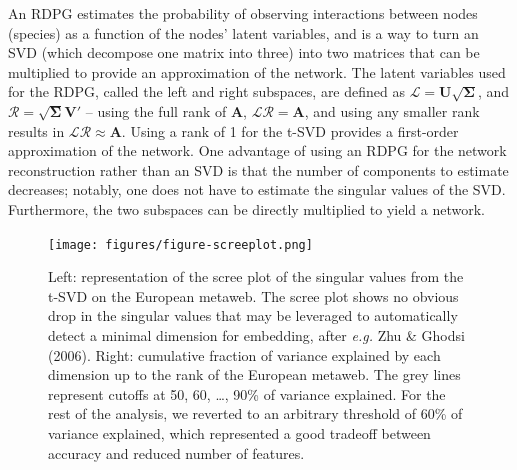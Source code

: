 \documentclass[10pt,oneside]{article}
\begin{document}
An RDPG estimates the probability of observing interactions between
nodes (species) as a function of the nodes' latent variables, and is a
way to turn an SVD (which decompose one matrix into three) into two
matrices that can be multiplied to provide an approximation of the
network. The latent variables used for the RDPG, called the left and
right subspaces, are defined as
\(\mathscr{L} = \mathbf{U}\sqrt{\mathbf{\Sigma}}\), and
\(\mathscr{R} = \sqrt{\mathbf{\Sigma}}\mathbf{V}'\) -- using the full
rank of \(\mathbf{A}\), \(\mathscr{L}\mathscr{R} = \mathbf{A}\), and
using any smaller rank results in
\(\mathscr{L}\mathscr{R} \approx \mathbf{A}\). Using a rank of 1 for the
t-SVD provides a first-order approximation of the network. One advantage
of using an RDPG for the network reconstruction rather than an SVD is
that the number of components to estimate decreases; notably, one does
not have to estimate the singular values of the SVD. Furthermore, the
two subspaces can be directly multiplied to yield a network.

\begin{figure}
\hypertarget{fig:scree}{%
\centering
\texttt{[image: figures/figure-screeplot.png]}
\caption{Left: representation of the scree plot of the singular values
from the t-SVD on the European metaweb. The scree plot shows no obvious
drop in the singular values that may be leveraged to automatically
detect a minimal dimension for embedding, after \emph{e.g.} Zhu \&
Ghodsi (2006). Right: cumulative fraction of variance explained by each
dimension up to the rank of the European metaweb. The grey lines
represent cutoffs at 50, 60, \ldots, 90\% of variance explained. For the
rest of the analysis, we reverted to an arbitrary threshold of 60\% of
variance explained, which represented a good tradeoff between accuracy
and reduced number of features.}\label{fig:scree}
}
\end{figure}
\end{document}
